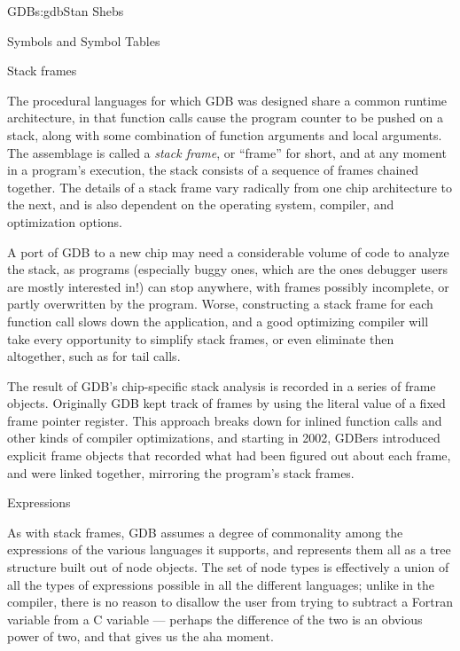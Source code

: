 \begin{aosachapter}{GDB}{s:gdb}{Stan Shebs}
\begin{aosasect2}{Symbols and Symbol Tables}
\end{aosasect2}

\begin{aosasect2}{Stack frames}

The procedural languages for which GDB was designed share a common
runtime architecture, in that function calls cause the program counter
to be pushed on a stack, along with some combination of function
arguments and local arguments.  The assemblage is called a {\em stack
  frame}, or ``frame'' for short, and at any moment in a program's
execution, the stack consists of a sequence of frames chained
together.  The details of a stack frame vary radically from one chip
architecture to the next, and is also dependent on the operating
system, compiler, and optimization options.

A port of GDB to a new chip may need a considerable volume of code to
analyze the stack, as programs (especially buggy ones, which are the
ones debugger users are mostly interested in!) can stop anywhere, with
frames possibly incomplete, or partly overwritten by the program.
Worse, constructing a stack frame for each function call slows down the
application, and a good optimizing compiler will take every
opportunity to simplify stack frames, or even eliminate then
altogether, such as for tail calls.

The result of GDB's chip-specific stack analysis is recorded in a
series of frame objects.  Originally GDB kept track of frames by using
the literal value of a fixed frame pointer register.  This approach
breaks down for inlined function calls and other kinds of compiler
optimizations, and starting in 2002, GDBers introduced explicit frame
objects that recorded what had been figured out about each frame, and
were linked together, mirroring the program's stack frames.

\end{aosasect2}

\begin{aosasect2}{Expressions}

As with stack frames, GDB assumes a degree of commonality among the
expressions of the various languages it supports, and represents them
all as a tree structure built out of node objects.  The set of node
types is effectively a union of all the types of expressions possible
in all the different languages; unlike in the compiler, there is no
reason to disallow the user from trying to subtract a Fortran variable
from a C variable --- perhaps the difference of the two is an obvious
power of two, and that gives us the aha moment.


\end{aosasect2}
\end{aosachapter}
